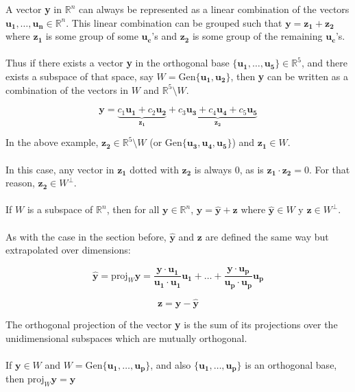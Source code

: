 \documentclass[12pt]{article}
\newcommand{\gen}[1]{\mathrm{Gen}\{{#1}\}}
\newcommand{\R}{\mathbb{R}}
\newcommand{\bt}[1]{\textbf{{#1}}}
\newcommand{\bm}[1]{\mathbf{{#1}}}
\newcommand{\set}[1]{\{{#1}\}}
\begin{document}
A vector \bt{y} in $\R^n$ can always be represented as a linear combination of the vectors $\bm{u_1},\dots,\bm{u_n} \in \R^n$.
This linear combination can be grouped such that $\bm{y = z_1 + z_2}$ where $\bm{z_1}$ is some group of some $\bm{u_c}$'s and $\bm{z_2}$ is
some group of the remaining $\bm{u_c}$'s. \\ \\

Thus if there exists a vector \bt{y} in the orthogonal base $\set{\bm{u_1,\dots,u_5}} \in \R^5$, and there exists a subspace of that space, say $W = \gen{\bm{u_1, u_2}}$, then \bt{y} can
be written as a combination of the vectors in $W$ and $\R^5\setminus W$.

$$\bm{y} = \underbrace{c_1\bm{u_1} + c_2\bm{u_2}}_{\bm{z_1}} + \underbrace{c_3\bm{u_3} + c_4\bm{u_4} + c_5\bm{u_5}}_{\bm{z_2}}$$

In the above example, $\bm{z_2} \in \R^5 \setminus W$ (or $\gen{\bm{u_3, u_4, u_5}}$) and $\bm{z_1} \in W$. \\ \\

In this case, any vector in $\bm{z_1}$ dotted with $\bm{z_2}$ is always $0$, as is $\bm{z_1 \cdot z_2} = 0$. For that reason,
$\bm{z_2} \in W^\perp$. \\ \\

If $W$ is a subspace of $\R^n$, then for all $\bm{y} \in \R^n$, $\bm{y} = \bm{\hat{y}} + \bm{z}$ where $\bm{\hat{y}} \in W$ y $\bm{z} \in W^\perp$. \\ \\

As with the case in the section before, $\bm{\hat{y}}$ and $\bm{z}$ are defined the same way but extrapolated over dimensions:

$$\bm{\hat{y}} = \textrm{proj}_W\bm{y} = \frac{\bm{y \cdot u_1}}{\bm{u_1 \cdot u_1}}\bm{u_1} + \dots + \frac{\bm{y \cdot u_p}}{\bm{u_p \cdot u_p}}\bm{u_p}$$

$$\bm{z = y - \hat{y}}$$

The orthogonal projection of the vector \bt{y} is the sum of its projections over the unidimensional subspaces which are mutually orthogonal. \\ \\

If $\bm{y} \in W$ and $W = \gen{\bm{u_1,\dots,u_p}}$, and also $\set{\bm{u_1,\dots,u_p}}$ is an orthogonal base, then $\textrm{proj}_W\bm{y} = \bm{y}$ \\ \\
\end{document}
